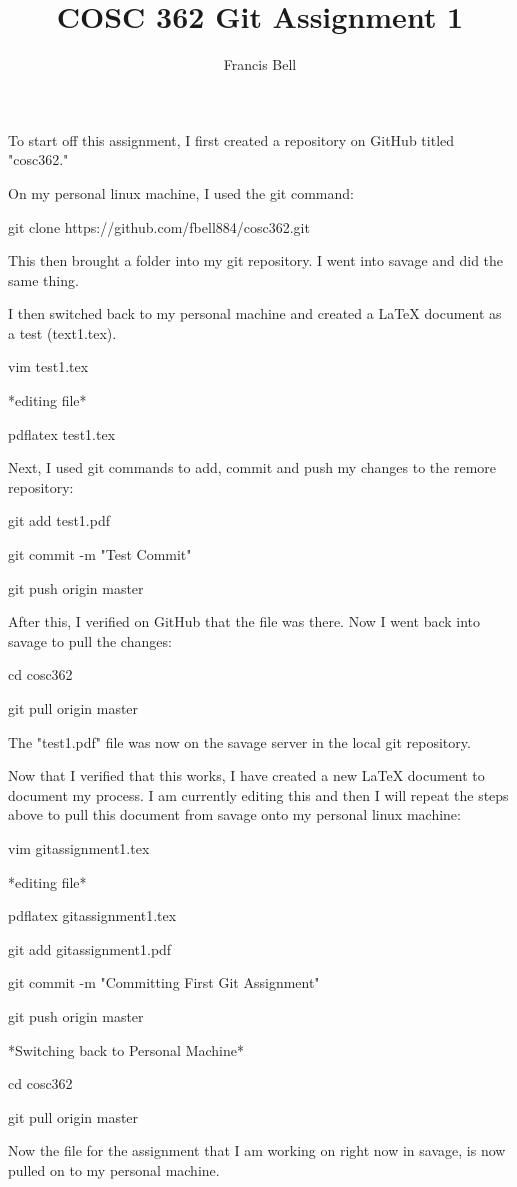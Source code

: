 \documentclass[12pt]{article}
\author{Francis Bell}
\title{COSC 362 Git Assignment 1}
\begin{document}
\maketitle

To start off this assignment, I first created a repository on GitHub titled "cosc362."

On my personal linux machine, I used the git command: 

	git clone https://github.com/fbell884/cosc362.git

This then brought a folder into my git repository. I went into savage and did the same thing.

I then switched back to my personal machine and created a LaTeX document as a test (text1.tex). 
	
	vim test1.tex

	*editing file*

	pdflatex test1.tex

Next, I used git commands to add, commit and push my changes to the remore repository:

	git add test1.pdf
	
	git commit -m "Test Commit" 

	git push origin master

After this, I verified on GitHub that the file was there. Now I went back into savage to pull the changes: 

	cd cosc362

	git pull origin master

The "test1.pdf" file was now on the savage server in the local git repository. 

Now that I verified that this works, I have created a new LaTeX document to document my process. I am currently editing this and then I will repeat the steps above to pull this document from savage onto my personal linux machine:

	vim gitassignment1.tex

	*editing file*

	pdflatex gitassignment1.tex

	git add gitassignment1.pdf

	git commit -m "Committing First Git Assignment"

	git push origin master

*Switching back to Personal Machine*

	cd cosc362

	git pull origin master

Now the file for the assignment that I am working on right now in savage, is now pulled on to my personal machine.




 		
\end{document}
